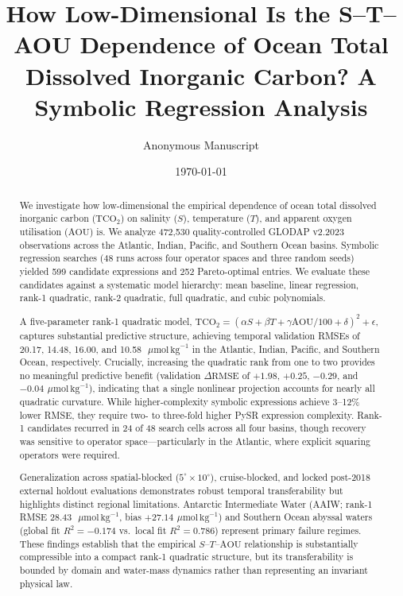 \documentclass[12pt,a4paper]{article}
\title{How Low-Dimensional Is the S--T--AOU Dependence of Ocean Total Dissolved Inorganic Carbon? A Symbolic Regression Analysis}
\author{Anonymous Manuscript}
\date{\today}
\newcommand{\tco}{\mathrm{TCO_2}}
\newcommand{\aou}{\mathrm{AOU}}
\newcommand{\umol}{\,\mu\mathrm{mol}\,\mathrm{kg}^{-1}}
\begin{document}
\maketitle

\begin{abstract}
We investigate how low-dimensional the empirical dependence of ocean total dissolved inorganic carbon ($\tco$) on salinity ($S$), temperature ($T$), and apparent oxygen utilisation ($\aou$) is. We analyze 472,530 quality-controlled GLODAP v2.2023 observations across the Atlantic, Indian, Pacific, and Southern Ocean basins. Symbolic regression searches (48 runs across four operator spaces and three random seeds) yielded 599 candidate expressions and 252 Pareto-optimal entries. We evaluate these candidates against a systematic model hierarchy: mean baseline, linear regression, rank-1 quadratic, rank-2 quadratic, full quadratic, and cubic polynomials.

A five-parameter rank-1 quadratic model, $\tco = (\alpha S + \beta T + \gamma \aou/100 + \delta)^2 + \epsilon$, captures substantial predictive structure, achieving temporal validation RMSEs of 20.17, 14.48, 16.00, and 10.58~$\umol$ in the Atlantic, Indian, Pacific, and Southern Ocean, respectively. Crucially, increasing the quadratic rank from one to two provides no meaningful predictive benefit (validation $\Delta\mathrm{RMSE}$ of $+1.98$, $+0.25$, $-0.29$, and $-0.04~\umol$), indicating that a single nonlinear projection accounts for nearly all quadratic curvature. While higher-complexity symbolic expressions achieve 3--12\% lower RMSE, they require two- to three-fold higher PySR expression complexity. Rank-1 candidates recurred in 24 of 48 search cells across all four basins, though recovery was sensitive to operator space---particularly in the Atlantic, where explicit squaring operators were required.

Generalization across spatial-blocked ($5^\circ\times 10^\circ$), cruise-blocked, and locked post-2018 external holdout evaluations demonstrates robust temporal transferability but highlights distinct regional limitations. Antarctic Intermediate Water (AAIW; rank-1 RMSE 28.43~$\umol$, bias $+27.14~\umol$) and Southern Ocean abyssal waters (global fit $R^2 = -0.174$ vs.\ local fit $R^2 = 0.786$) represent primary failure regimes. These findings establish that the empirical $S$--$T$--$\aou$ relationship is substantially compressible into a compact rank-1 quadratic structure, but its transferability is bounded by domain and water-mass dynamics rather than representing an invariant physical law.
\end{abstract}
\end{document}
